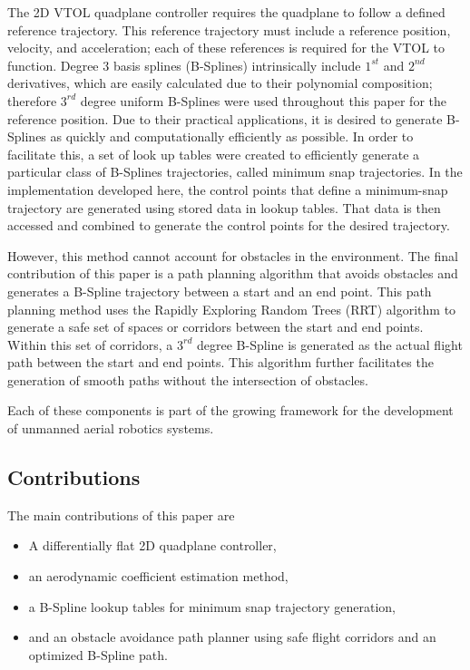 The 2D VTOL quadplane controller requires the quadplane to follow a defined reference trajectory.
This reference trajectory must include a reference position, velocity, and acceleration; each of these references is required for the VTOL to function.
Degree $3$ basis splines (B-Splines) intrinsically include $1^{st}$ and $2^{nd}$ derivatives, which are easily calculated due to their polynomial composition; therefore $3^{rd}$ degree uniform B-Splines were used throughout this paper for the reference position.
Due to their practical applications, it is desired to generate B-Splines as quickly and computationally efficiently as possible.
In order to facilitate this, a set of look up tables were created to efficiently generate a particular class of B-Splines trajectories, called minimum snap trajectories.
In the implementation developed here, the control points that define a minimum-snap trajectory are generated using stored data in lookup tables.
That data is then accessed and combined to generate the control points for the desired trajectory.

However, this method cannot account for obstacles in the environment. 
The final contribution of this paper is a path planning algorithm that avoids obstacles and generates a B-Spline trajectory between a start and an end point.
This path planning method uses the Rapidly Exploring Random Trees (RRT) algorithm to generate a safe set of spaces or corridors between the start and end points.
Within this set of corridors, a $3^{rd}$ degree B-Spline is generated as the actual flight path between the start and end points.
This algorithm further facilitates the generation of smooth paths without the intersection of obstacles.

Each of these components is part of the growing framework for the development of unmanned aerial robotics systems.

\subsection{Contributions}

The main contributions of this paper are

\begin{itemize}
    \item A differentially flat 2D quadplane controller,
    \item an aerodynamic coefficient estimation method,
    \item a B-Spline lookup tables for minimum snap trajectory generation,
    \item and an obstacle avoidance path planner using safe flight corridors and an optimized B-Spline path.
\end{itemize}


